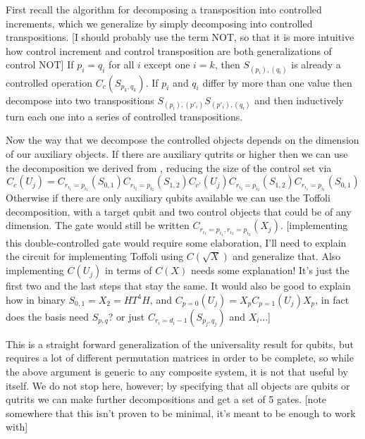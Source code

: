 \documentclass[]{article}
\begin{document}
First recall the algorithm for decomposing a transposition into controlled increments, which we generalize by simply decomposing into controlled transpositions. [I should probably use the term NOT, so that it is more intuitive how control increment and control transposition are both generalizations of control NOT] If $p_i = q_i$ for all $i$ except one $i = k$, then $S_{(p_i), (q_i)}$ is already a controlled operation $C_c(S_{p_k,q_k})$. If $p_i$ and $q_i$ differ by more than one value then decompose into two transpositions $S_{(p_i), (p'_i)}S_{(p'_i), (q_i)}$ and then inductively turn each one into a series of controlled transpositions.

Now the way that we decompose the controlled objects depends on the dimension of our auxiliary objects. If there are auxiliary qutrits or higher then we can use the decomposition we derived from \cite{multi-valued-logic}, reducing the size of the control set via
\[
C_c(U_j) = C_{r_{i_1}=p_{i_1}}(S_{0,1})
C_{r_{i_2}=p_{i_2}}(S_{1,2})
C_{c'}(U_j)
C_{r_{i_2}=p_{i_2}}(S_{1,2})
C_{r_{i_1}=p_{i_1}}(S_{0,1})
\]
Otherwise if there are only auxiliary qubits available we can use the Toffoli decomposition, with a target qubit and two control objects that could be of any dimension. The gate would still be written $C_{r_{i_1}=p_{i_1},r_{i_2}=p_{i_2}}(X_j)$. [implementing this double-controlled gate would require some elaboration, I'll need to explain the circuit for implementing Toffoli using $C(\sqrt{X})$ and generalize that. Also implementing $C(U_j)$ in terms of $C(X)$ needs some explanation! It's just the first two and the last steps that stay the same. It would also be good to explain how in binary $S_{0,1} = X_2 = HT^4H$, and $C_{p=0}(U_j) = X_pC_{p=1}(U_j)X_p$, in fact does the basis need $S_{p,q}$? or just $C_{r_i=d_i-1}(S_{p_j,q_j})$ and $X_i$...]

This is a straight forward generalization of the universality result for qubits, but requires a lot of different permutation matrices in order to be complete, so while the above argument is generic to any composite system, it is not that useful by itself. We do not stop here, however; by specifying that all objects are qubits or qutrits we can make further decompositions and get a set of 5 gates. [note somewhere that this isn't proven to be minimal, it's meant to be enough to work with]
\end{document}
